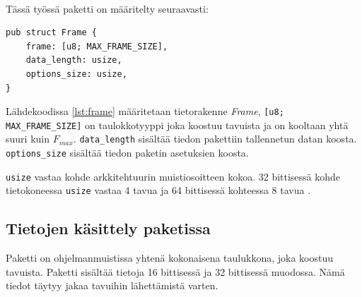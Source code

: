 \documentclass[a4paper,12pt]{article}
\begin{document}
     
\begin{table}[h!]\
    \centering
    \caption{Paketin rakenne}
    \label{tab:my_label}
\end{table}

Tässä työssä paketti on määritelty seuraavasti:
\begin{lstlisting}[caption={Paketin rakenne}, label={lst:frame}]
pub struct Frame {
    frame: [u8; MAX_FRAME_SIZE],
    data_length: usize,
    options_size: usize,
} 
\end{lstlisting}
Lähdekoodissa \ref{lst:frame} määritetaan tietorakenne \textit{Frame}, 
\lstinline{[u8; MAX_FRAME_SIZE]} on taulokkotyyppi joka koostuu tavuista ja on kooltaan yhtä suuri kuin $F_{max}$.
\lstinline{data_length} sisältää tiedon pakettiin tallennetun datan koosta. \lstinline{options_size} sisältää tiedon paketin asetuksien koosta.\par
\lstinline{usize} vastaa kohde arkkitehtuurin muistiosoitteen kokoa. 32 bittisessä kohde tietokoneessa \lstinline{usize} vastaa 4 tavua ja 64 bittisessä kohteessa 8 tavua \cite{rust-doc-usize}. 

\subsection{Tietojen käsittely paketissa}
    Paketti on ohjelmanmuistissa yhtenä kokonaisena taulukkona, joka koostuu tavuista. 
    Paketti sisältää tietoja 16 bittisessä ja 32 bittisessä muodossa. Nämä tiedot täytyy jakaa tavuihin lähettämistä varten. 
\end{document}
